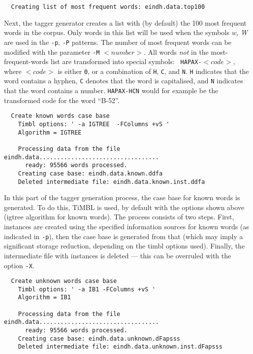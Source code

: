 \documentclass{report}
\begin{document}
{\small
\begin{verbatim}
  Creating list of most frequent words: eindh.data.top100
\end{verbatim}
}

Next, the tagger generator creates a list with (by default) the 100
most frequent words in the corpus. Only words in this list will be
used when the symbols {\em w, W} are used in the {\tt -p}, {\tt -P}
patterns. The number of most frequent words can be modified with the
parameter {\tt -M} $<number>$. All words {\em not}\/ in the
most-frequent-words list are transformed into special symbols: {\tt
HAPAX-}$<code>$, where $<code>$ is either {\tt 0}, or a combination of
{\tt H}, {\tt C}, and {\tt N}. {\tt H} indicates that the word
contains a hyphen, {\tt C} denotes that the word is capitalised, and
{\tt N} indicates that the word contains a number. {\tt HAPAX-HCN}
would for example be the transformed code for the word ``B-52''.

{\small
\begin{verbatim}
  Create known words case base
    Timbl options: ' -a IGTREE  -FColumns +vS '
    Algorithm = IGTREE

    Processing data from the file eindh.data..................................
      ready: 95566 words processed.
    Creating case base: eindh.data.known.ddfa
    Deleted intermediate file: eindh.data.known.inst.ddfa
\end{verbatim}
}

In this part of the tagger generation process, the case base for known
words is generated. To do this, TiMBL is used, by default with
the options shown above ({\sc igtree} algorithm for known
words). The process consists of two steps. First, instances are
created using the specified information sources for known words (as
indicated in {\tt -p}), then the case base is generated from that (which
may imply a significant storage reduction, depending on the {\sc
timbl} options used). Finally, the intermediate file with instances is
deleted --- this can be overruled with the option {\tt -X}.

{\small
\begin{verbatim}
  Create unknown words case base
    Timbl options: ' -a IB1 -FColumns +vS '
    Algorithm = IB1

    Processing data from the file eindh.data..................................
      ready: 95566 words processed.
    Creating case base: eindh.data.unknown.dFapsss
    Deleted intermediate file: eindh.data.unknown.inst.dFapsss
\end{verbatim}
}
\end{document}
